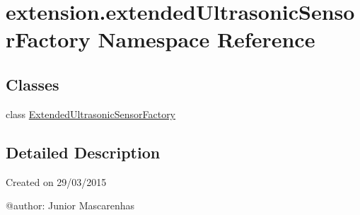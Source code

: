 \hypertarget{namespaceextension_1_1extendedUltrasonicSensorFactory}{}\section{extension.\+extended\+Ultrasonic\+Sensor\+Factory Namespace Reference}
\label{namespaceextension_1_1extendedUltrasonicSensorFactory}
\subsection*{Classes}
\begin{DoxyCompactItemize}
\item 
class \hyperlink{classextension_1_1extendedUltrasonicSensorFactory_1_1ExtendedUltrasonicSensorFactory}{Extended\+Ultrasonic\+Sensor\+Factory}
\end{DoxyCompactItemize}


\subsection{Detailed Description}
\begin{DoxyVerb}Created on 29/03/2015

@author: Junior Mascarenhas
\end{DoxyVerb}
 